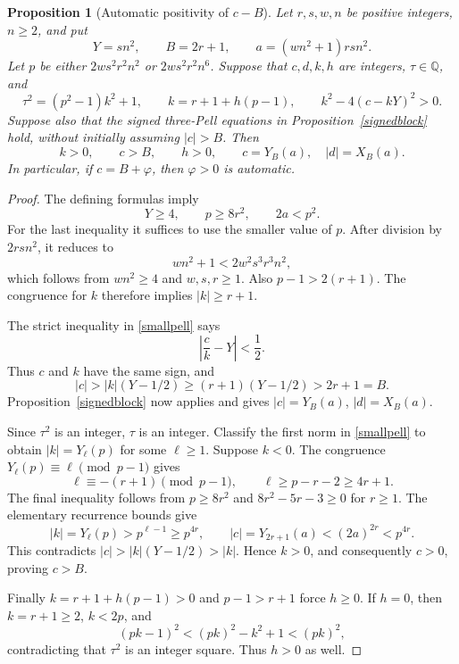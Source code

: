 \documentclass[11pt]{article}
\newtheorem{proposition}[theorem]{Proposition}
\newcommand{\Q}{\mathbb Q}
\begin{document}
\begin{proposition}[Automatic positivity of \(c-B\)]\label{phi}
Let \(r,s,w,n\) be positive integers, \(n\ge2\), and put
\[
 Y=sn^2,\qquad B=2r+1,\qquad
 a=(wn^2+1)rsn^2.
\]
Let \(p\) be either \(2ws^2r^2n^2\) or
\(2ws^2r^2n^6\).  Suppose that \(c,d,k,h\) are integers,
\(\tau\in\Q\), and
\begin{equation}\label{smallpell}
 \tau^2=(p^2-1)k^2+1,\qquad
 k=r+1+h(p-1),\qquad
 k^2-4(c-kY)^2>0.
\end{equation}
Suppose also that the signed three-Pell equations in
Proposition~\ref{signedblock} hold, without initially assuming
\(|c|>B\).  Then
\[
           k>0,\qquad c>B,\qquad h>0,
           \qquad c=Y_B(a),\quad |d|=X_B(a).
\]
In particular, if \(c=B+\varphi\), then \(\varphi>0\)
is automatic.
\end{proposition}
\begin{proof}
The defining formulas imply
\begin{equation}\label{bounds}
       Y\ge4,\qquad p\ge8r^2,\qquad 2a<p^2.
\end{equation}
For the last inequality it suffices to use the smaller value of \(p\).
After division by \(2rsn^2\), it reduces to
\[
        wn^2+1<2w^2s^3r^3n^2,
\]
which follows from \(wn^2\ge4\) and \(w,s,r\ge1\).
Also \(p-1>2(r+1)\).  The congruence for \(k\) therefore
implies \(|k|\ge r+1\).

The strict inequality in \eqref{smallpell} says
\[
                   \left|\frac ck-Y\right|<\frac12.
\]
Thus \(c\) and \(k\) have the same sign, and
\[
 |c|>|k|(Y-1/2)\ge(r+1)(Y-1/2)>2r+1=B.
\]
Proposition~\ref{signedblock} now applies and gives
\(|c|=Y_B(a)\), \(|d|=X_B(a)\).

Since \(\tau^2\) is an integer, \(\tau\) is an integer.
Classify the first norm in \eqref{smallpell} to obtain
\(|k|=Y_\ell(p)\) for some \(\ell\ge1\).
Suppose \(k<0\).  The congruence
\(Y_\ell(p)\equiv\ell\pmod {p-1}\) gives
\[
       \ell\equiv-(r+1)\pmod {p-1},
       \qquad \ell\ge p-r-2\ge4r+1.
\]
The final inequality follows from
\(p\ge8r^2\) and \(8r^2-5r-3\ge0\) for \(r\ge1\).
The elementary recurrence bounds give
\[
 |k|=Y_\ell(p)>p^{\ell-1}\ge p^{4r},
 \qquad |c|=Y_{2r+1}(a)<(2a)^{2r}<p^{4r}.
\]
This contradicts \(|c|>|k|(Y-1/2)>|k|\).  Hence \(k>0\),
and consequently \(c>0\), proving \(c>B\).

Finally \(k=r+1+h(p-1)>0\) and \(p-1>r+1\) force
\(h\ge0\).  If \(h=0\), then \(k=r+1\ge2\), \(k<2p\),
and
\[
         (pk-1)^2<(pk)^2-k^2+1<(pk)^2,
\]
contradicting that \(\tau^2\) is an integer square.
Thus \(h>0\) as well.
\end{proof}
\end{document}
